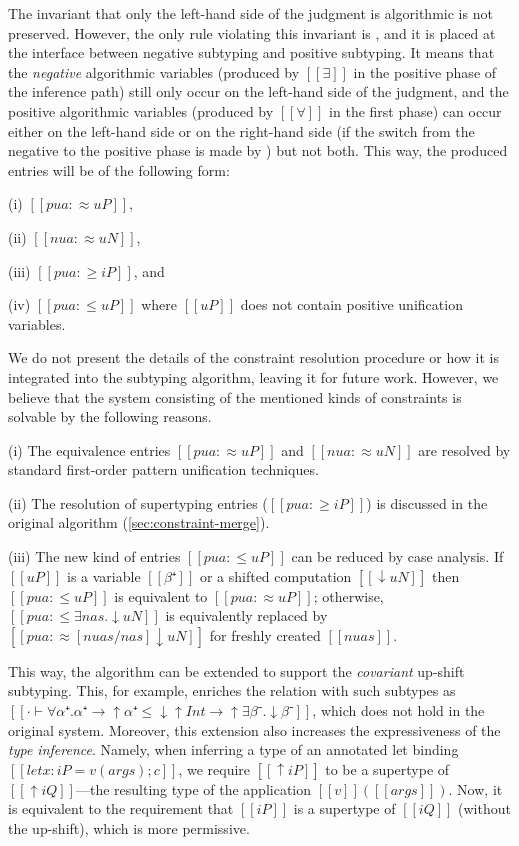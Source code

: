 The invariant that only the left-hand side of the judgment is algorithmic is not
preserved. However, the only rule violating this invariant is
, and it is placed at the interface between
negative subtyping and positive subtyping. It means that the \emph{negative}
algorithmic variables (produced by $[[∃]]$ in the positive phase of the
inference path) still only occur on the left-hand side of the judgment, and the
positive algorithmic variables (produced by $[[∀]]$ in the first phase) can
occur either on the left-hand side or on the right-hand side (if the switch from
the negative to the positive phase is made by )
but not both.
This way, the produced entries will be of the following form:
\begin{itemize*}
    \item[(i)] $[[pua :≈ uP]]$, 
    \item[(ii)] $[[nua :≈ uN]]$, 
    \item[(iii)] $[[pua :≥ iP]]$, and
    \item[(iv)] $[[pua :≤ uP]]$ where $[[uP]]$ does not contain positive unification variables.
\end{itemize*}

We do not present the details of the constraint resolution procedure or how it
is integrated into the subtyping algorithm, leaving it for future work. However,
we believe that the system consisting of the mentioned kinds of constraints is solvable
by the following reasons.
\begin{enumerate*}
    \item[(i)] The equivalence entries $[[pua :≈ uP]]$ and $[[nua :≈ uN]]$ are resolved by standard first-order pattern unification techniques.
    \item[(ii)] The resolution of supertyping entries ($[[pua :≥ iP]]$) is discussed in the original algorithm (\cref{sec:constraint-merge}).
    \item[(iii)] The new kind of entries $[[pua :≤ uP]]$ can be
        reduced by case analysis. If $[[uP]]$ is a variable $[[β⁺]]$
        or a shifted computation $[[↓uN]]$ then 
        $[[pua :≤ uP]]$ is equivalent to $[[pua :≈ uP]]$;
        otherwise, $[[pua :≤ ∃nas.↓uN]]$ is equivalently replaced by $[[pua :≈ [nuas/nas]↓uN]]$
        for freshly created $[[nuas]]$.
\end{enumerate*}

This way, the algorithm can be extended to support the \emph{covariant} up-shift
subtyping. This, for example, enriches the relation with such subtypes as $[[· ⊢
∀α⁺.α⁺→↑α⁺ ≤ ↓↑Int → ↑∃β⁻.↓β⁻]]$, which does not hold in the original system.
Moreover, this extension also increases the expressiveness of the \emph{type
inference}. Namely, when inferring a type of an annotated let binding 
$[[let x:iP = v(args); c]]$, we require $[[↑iP]]$ to be a supertype of 
$[[↑iQ]]$---the resulting type of the application $[[v]]([[args]])$. 
Now, it is equivalent to the requirement that $[[iP]]$ is a supertype of $[[iQ]]$
(without the up-shift), which is more permissive.

